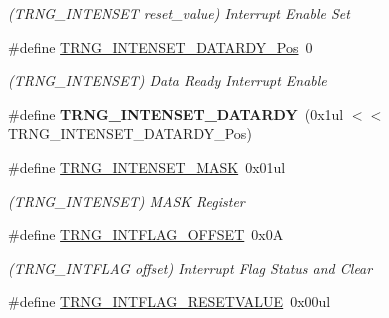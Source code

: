 \begin{DoxyCompactItemize}
\begin{DoxyCompactList}\small\item\em (T\+R\+N\+G\+\_\+\+I\+N\+T\+E\+N\+S\+E\+T reset\+\_\+value) Interrupt Enable Set \end{DoxyCompactList}\item 
\hypertarget{group___s_a_m_l21___t_r_n_g_ga620158ff7cc7e38e9c2663237fb16945}{}\#define \hyperlink{group___s_a_m_l21___t_r_n_g_ga620158ff7cc7e38e9c2663237fb16945}{T\+R\+N\+G\+\_\+\+I\+N\+T\+E\+N\+S\+E\+T\+\_\+\+D\+A\+T\+A\+R\+D\+Y\+\_\+\+Pos}~0\label{group___s_a_m_l21___t_r_n_g_ga620158ff7cc7e38e9c2663237fb16945}

\begin{DoxyCompactList}\small\item\em (T\+R\+N\+G\+\_\+\+I\+N\+T\+E\+N\+S\+E\+T) Data Ready Interrupt Enable \end{DoxyCompactList}\item 
\hypertarget{group___s_a_m_l21___t_r_n_g_ga5b888f20d4ef91c2ff2d44f8b531c4d4}{}\#define {\bfseries T\+R\+N\+G\+\_\+\+I\+N\+T\+E\+N\+S\+E\+T\+\_\+\+D\+A\+T\+A\+R\+D\+Y}~(0x1ul $<$$<$ T\+R\+N\+G\+\_\+\+I\+N\+T\+E\+N\+S\+E\+T\+\_\+\+D\+A\+T\+A\+R\+D\+Y\+\_\+\+Pos)\label{group___s_a_m_l21___t_r_n_g_ga5b888f20d4ef91c2ff2d44f8b531c4d4}

\item 
\hypertarget{group___s_a_m_l21___t_r_n_g_gaf5c80d1bb486f56ab23d106a7bf9f821}{}\#define \hyperlink{group___s_a_m_l21___t_r_n_g_gaf5c80d1bb486f56ab23d106a7bf9f821}{T\+R\+N\+G\+\_\+\+I\+N\+T\+E\+N\+S\+E\+T\+\_\+\+M\+A\+S\+K}~0x01ul\label{group___s_a_m_l21___t_r_n_g_gaf5c80d1bb486f56ab23d106a7bf9f821}

\begin{DoxyCompactList}\small\item\em (T\+R\+N\+G\+\_\+\+I\+N\+T\+E\+N\+S\+E\+T) M\+A\+S\+K Register \end{DoxyCompactList}\item 
\hypertarget{group___s_a_m_l21___t_r_n_g_ga6b6cfdc19ba6bbd017d2fd17a04c880d}{}\#define \hyperlink{group___s_a_m_l21___t_r_n_g_ga6b6cfdc19ba6bbd017d2fd17a04c880d}{T\+R\+N\+G\+\_\+\+I\+N\+T\+F\+L\+A\+G\+\_\+\+O\+F\+F\+S\+E\+T}~0x0\+A\label{group___s_a_m_l21___t_r_n_g_ga6b6cfdc19ba6bbd017d2fd17a04c880d}

\begin{DoxyCompactList}\small\item\em (T\+R\+N\+G\+\_\+\+I\+N\+T\+F\+L\+A\+G offset) Interrupt Flag Status and Clear \end{DoxyCompactList}\item 
\hypertarget{group___s_a_m_l21___t_r_n_g_gaaf2fb9d6d1b64cb20ca051e83dc0db3b}{}\#define \hyperlink{group___s_a_m_l21___t_r_n_g_gaaf2fb9d6d1b64cb20ca051e83dc0db3b}{T\+R\+N\+G\+\_\+\+I\+N\+T\+F\+L\+A\+G\+\_\+\+R\+E\+S\+E\+T\+V\+A\+L\+U\+E}~0x00ul\label{group___s_a_m_l21___t_r_n_g_gaaf2fb9d6d1b64cb20ca051e83dc0db3b}


\end{DoxyCompactItemize}

